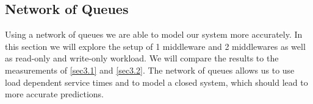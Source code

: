 \documentclass[11pt,a4paper]{article}
\begin{document}
\subsection{Network of Queues} \label{sec7.3}
Using a network of queues we are able to model our system more accurately. In this section we will explore the setup of 1 middleware and 2 middlewares as well as read-only and write-only workload. We will compare the results to the measurements of \autoref{sec3.1} and \autoref{sec3.2}. The network of queues allows us to use load dependent service times and to model a closed system, which should lead to more accurate predictions.
\end{document}
